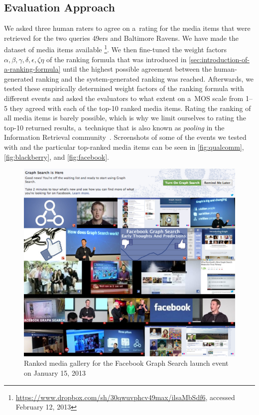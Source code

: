 \subsection{Evaluation Approach}

We asked three human raters to agree on a~rating for the media items
that were retrieved for the two queries 49ers and Baltimore Ravens.
We have made the dataset of media items available%
\footnote{\url{https://www.dropbox.com/sh/30qwuvphcv49max/ilsaMbSdf6},
accessed February 12, 2013}.
We then fine-tuned the weight factors
$ \alpha, \beta, \gamma, \delta, \epsilon, \zeta \eta $ of the ranking formula
that was introduced in \autoref{sec:introduction-of-a-ranking-formula}
until the highest possible agreement between the human-generated ranking
and the system-generated ranking was reached.
Afterwards, we tested these empirically determined weight factors of the ranking formula
with different events and asked the evaluators to what extent
on a~MOS scale from 1--5 they agreed with each of the top-10 ranked media items.
Rating the ranking of all media items is barely possible,
which is why we limit ourselves to rating the top-10 returned results,
a~technique that is also known as \emph{pooling}
in the Information Retrieval community~\cite{liu2009learningtorank}.
Screenshots of some of the events we tested with
and the particular top-ranked media items can be seen in 
\autoref{fig:qualcomm}, \autoref{fig:blackberry}, and \autoref{fig:facebook}.

\begin{figure}[htb]
  \centering
  \includegraphics[width=0.75\linewidth]{facebook.png}
  \caption[Ranked media gallery for the Facebook Graph Search launch event]
  {Ranked media gallery for the Facebook Graph Search launch event
  on January 15, 2013}
  \label{fig:facebook}
\end{figure}

